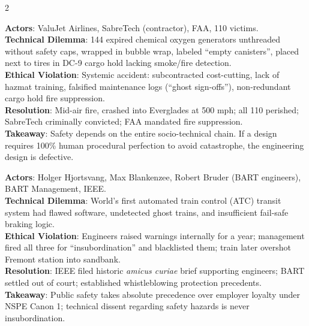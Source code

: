\documentclass[9pt,a4paper]{extarticle}
\begin{document}
\begin{multicols}{2}
\begin{tcolorbox}[casebox,title={15. ValuJet Flight 592 (1996)}]
\textbf{Actors}: ValuJet Airlines, SabreTech (contractor), FAA, 110 victims.\\
\textbf{Technical Dilemma}: 144 expired chemical oxygen generators unthreaded without safety caps, wrapped in bubble wrap, labeled ``empty canisters'', placed next to tires in DC-9 cargo hold lacking smoke/fire detection.\\
\textbf{Ethical Violation}: Systemic accident: subcontracted cost-cutting, lack of hazmat training, falsified maintenance logs (``ghost sign-offs''), non-redundant cargo hold fire suppression.\\
\textbf{Resolution}: Mid-air fire, crashed into Everglades at 500 mph; all 110 perished; SabreTech criminally convicted; FAA mandated fire suppression.\\
\textbf{Takeaway}: Safety depends on the entire socio-technical chain. If a design requires 100\% human procedural perfection to avoid catastrophe, the engineering design is defective.
\end{tcolorbox}

\begin{tcolorbox}[casebox,title={16. BART Automated Train Control (1970s)}]
\textbf{Actors}: Holger Hjortsvang, Max Blankenzee, Robert Bruder (BART engineers), BART Management, IEEE.\\
\textbf{Technical Dilemma}: World's first automated train control (ATC) transit system had flawed software, undetected ghost trains, and insufficient fail-safe braking logic.\\
\textbf{Ethical Violation}: Engineers raised warnings internally for a year; management fired all three for ``insubordination'' and blacklisted them; train later overshot Fremont station into sandbank.\\
\textbf{Resolution}: IEEE filed historic \textit{amicus curiae} brief supporting engineers; BART settled out of court; established whistleblowing protection precedents.\\
\textbf{Takeaway}: Public safety takes absolute precedence over employer loyalty under NSPE Canon 1; technical dissent regarding safety hazards is never insubordination.
\end{tcolorbox}


\end{multicols}
\end{document}
